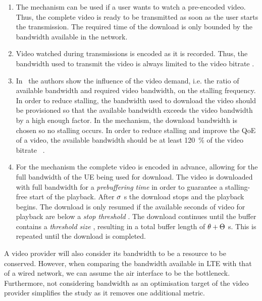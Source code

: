 \begin{enumerate}
\item \textbf{\download} The \emph{\download} mechanism can be used if a user wants to watch a pre-encoded video.
Thus, the complete video is ready to be transmitted as soon as the user starts the transmission.
The required time of the download is only bounded by the bandwidth available in the network.

\item \textbf{\live} Video watched during \emph{\live} transmissions is encoded as it is recorded.
Thus, the bandwidth used to transmit the video is always limited to the video bitrate \bitrate.

\item \textbf{\serviceprovisioning} In~\cite{Hossfeld2011a} the authors show the influence of the video demand, i.e. the ratio of available bandwidth and required video bandwidth, on the stalling frequency.
In order to reduce stalling, the bandwidth used to download the video should be provisioned so that the available bandwidth exceeds the video bandwidth by a high enough factor.
In the \emph{\serviceprovisioning} mechanism, the download bandwidth is chosen so no stalling occurs.
In order to reduce stalling and improve the \gls{QoE} of a video, the available bandwidth should be at least \SI{120}{\percent} of the video bitrate \bitrate~\cite{Hossfeld13a}.

\item \textbf{\streaming} For the \emph{\streaming} mechanism the complete video is encoded in advance, allowing for the full bandwidth of the \gls{UE} being used for download.
The video is downloaded with full bandwidth for a \emph{prebuffering time} \streamingstart in order to guarantee a stalling-free start of the playback.
After \(\sigma\) \si{\second} the download stops and the playback begins.
The download is only resumed if the available seconds of video for playback are below a \emph{stop threshold} \bufferlower.
The download continues until the buffer contains a \emph{threshold size} \buffersize, resulting in a total buffer length of \(\theta + \Theta\) \si{\second}.
This is repeated until the download is completed.
\end{enumerate}

A video provider will also consider its bandwidth to be a resource to be conserved.
However, when comparing the bandwidth available in \gls{LTE} with that of a wired network, we can assume the air interface to be the bottleneck.
Furthermore, not considering bandwidth as an optimisation target of the video provider simplifies the study as it removes one additional metric.

